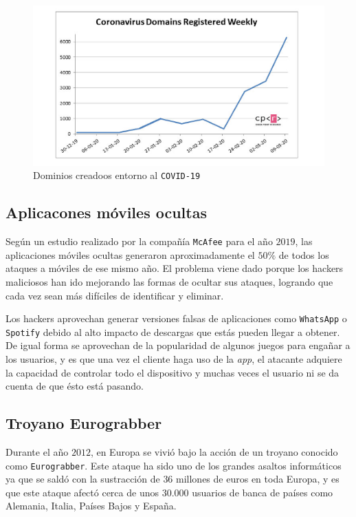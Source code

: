 \documentclass[12pt]{article}
\newcommand{\newpar} {
    \vskip 1cm
}
\begin{document}
            \begin{figure}
                \centering
                \includegraphics[width=\linewidth]{covid_malware.png}
                \caption{Dominios creadoos entorno al \texttt{COVID-19}}
                \label{f:covid_malware}
            \end{figure}

        \subsection{Aplicacones móviles ocultas}
            Según un estudio realizado por la compañía \texttt{McAfee} para el año $2019$, las aplicaciones móviles ocultas generaron aproximadamente el $50\%$ de todos los ataques a móviles de ese mismo año. El problema viene dado porque los hackers maliciosos han ido mejorando las formas de ocultar sus ataques, logrando que cada vez sean más difíciles de identificar y eliminar.

            \newpar

            Los hackers aprovechan generar versiones falsas de aplicaciones como \texttt{WhatsApp} o \texttt{Spotify} debido al alto impacto de descargas que estás pueden llegar a obtener. De igual forma se aprovechan de la popularidad de algunos juegos para engañar a los usuarios, y es que una vez el cliente haga uso de la \textit{app}, el atacante adquiere la capacidad de controlar todo el dispositivo y muchas veces el usuario ni se da cuenta de que ésto está pasando.

        \subsection{Troyano Eurograbber}
            Durante el año $2012$, en Europa se vivió bajo la acción de un troyano conocido como \texttt{Eurograbber}. Este ataque ha sido uno de los grandes asaltos informáticos ya que se saldó con la sustracción de $36$ millones de euros en toda Europa, y es que este ataque afectó cerca de unos $30.000$ usuarios de banca de países como Alemania, Italia, Países Bajos y España.
\end{document}
